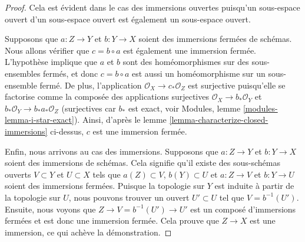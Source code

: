 \begin{proof}
Cela est évident dans le cas des immersions ouvertes puisqu'un sous-espace ouvert d'un
sous-espace ouvert est également un sous-espace ouvert.

\medskip\noindent
Supposons que $a : Z \to Y$ et $b : Y \to X$ soient des immersions fermées de schémas.
Nous allons vérifier que $c = b \circ a$ est également une immersion
fermée. L'hypothèse implique que $a$ et $b$ sont des homéomorphismes sur des sous-ensembles
fermés, et donc $c = b \circ a$ est aussi un homéomorphisme sur un sous-ensemble
fermé. De plus, l'application $\mathcal{O}_X \to c_*\mathcal{O}_Z$ est surjective
puisqu'elle se factorise comme la composée des applications
surjectives $\mathcal{O}_X \to b_*\mathcal{O}_Y$
et $b_*\mathcal{O}_Y \to b_*a_*\mathcal{O}_Z$ (surjectives car $b_*$ est exact,
voir Modules, lemme \ref{modules-lemma-i-star-exact}). Ainsi,
d'après le lemme \ref{lemma-characterize-closed-immersions}
ci-dessus, $c$ est une immersion fermée.

\medskip\noindent
Enfin, nous arrivons au cas des immersions. Supposons
que $a : Z \to Y$ et $b : Y \to X$ soient des immersions de schémas. Cela
signifie qu’il existe des sous-schémas ouverts
$V \subset Y$ et $U \subset X$ tels que $a(Z)
\subset V$, $b(Y) \subset U$ et $a : Z \to V$ et $b : Y \to U$
soient des immersions fermées. Puisque la
topologie sur $Y$ est induite à partir de la topologie sur $U$, nous
pouvons trouver un ouvert $U' \subset U$ tel que $V =
b^{-1}(U')$. Ensuite, nous voyons que $Z \to
V = b^{-1}(U') \to U'$ est un composé d’immersions
fermées et est donc une immersion fermée. Cela prouve
que $Z \to X$ est une immersion, ce qui achève la démonstration.
\end{proof}

















